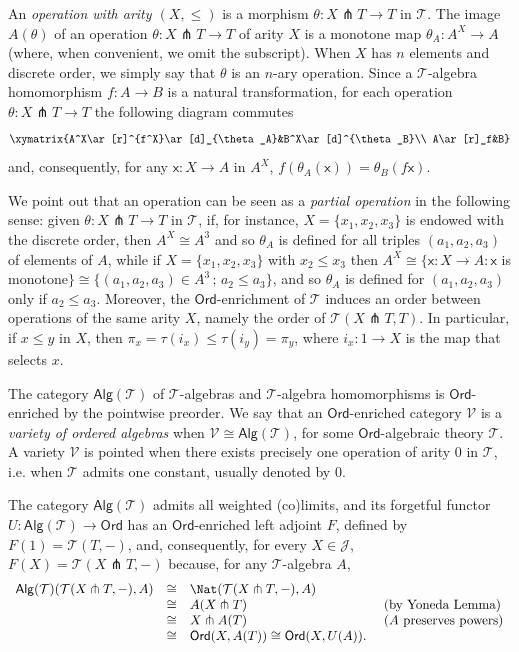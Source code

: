 \documentclass[11pt]{amsart}
\theoremstyle{plain}
\theoremstyle{definition}
\theoremstyle{remark}
\newcommand{\V}{\ensuremath{\mathcal{V}}}
\newcommand{\Ord}{\ensuremath{\mathsf{Ord}}}
\def\xx{\mathsf{x}}
\newcommand{\J}{\ensuremath{\mathcal{J}}}
\newcommand{\T}{\ensuremath{\mathcal{T}}}
\newcommand{\Alg}[1]{\ensuremath{\mathsf{Alg}(#1)}}
\begin{document}
  An \emph{operation with arity $(X,\le)$} is a morphism $\theta\colon X\pitchfork T  \to T$ in $\T$. The image $A(\theta)$ of an operation $\theta\colon X\pitchfork T\to T$ of arity $X$ is a monotone map $\theta_A\colon A^X\to A$ (where, when convenient, we omit the subscript). When $X$ has $n$ elements and discrete order, we simply say that $\theta$ is an $n$-ary operation.
  Since a $\T$-algebra homomorphism $f\colon A\to B$ is a natural transformation, for each operation $\theta\colon X\pitchfork T\to T$ the following diagram commutes
  \[\xymatrix{A^X\ar[r]^{f^X}\ar[d]_{\theta_A}&B^X\ar[d]^{\theta_B}\\
  A\ar[r]_f&B}\]
  and, consequently, for any $\xx\colon X\to A$ in $A^X$, $f(\theta_A(\xx))=\theta_B(f\xx).$

  We point out that an operation can be seen as a \emph{partial operation} in the following sense: given $\theta\colon X\pitchfork T\to T$ in $\T$, if, for instance, $X=\{x_1,x_2,x_3\}$ is endowed with the discrete order, then $A^X\cong A^3$ and so $\theta_A$ is defined for all triples $(a_1,a_2,a_3)$ of elements of $A$, while if $X=\{x_1,x_2,x_3\}$ with $x_2\leq x_3$ then $A^X\cong\{\xx\colon X\to A: \xx$ is monotone$\}\cong\{(a_1,a_2,a_3)\in A^3\,;\,a_2\leq a_3\}$, and so $\theta_A$ is defined for $(a_1,a_2,a_3)$ only if $a_2\leq a_3$. Moreover, the $\Ord$-enrichment of $\T$ induces an order between operations of the same arity $X$, namely the order of $\T(X\pitchfork T,T)$. In particular, if $x\leq y$ in $X$, then $\pi_x=\tau(i_x)\leq\tau(i_y)=\pi_y$, where $i_x\colon 1\to X$ is the map that selects $x$.


The category $\Alg{\T}$ of $\T$-algebras and $\T$-algebra homomorphisms is $\Ord$-enriched by the pointwise preorder. We say that an $\Ord$-enriched category $\V$ is a \emph{variety of ordered algebras} when $\V\cong \Alg{\T}$, for some $\Ord$-algebraic theory $\T$. A variety $\V$ is pointed when there exists precisely one operation of arity 0 in $\T$, i.e. when $\T$ admits one constant, usually denoted by 0.

The category $\Alg{\T}$ admits all weighted (co)limits, and its forgetful functor $U\colon\Alg\T\to\Ord$ has an $\Ord$-enriched left adjoint $F$, defined by
$F(1)=\T(T,-)$,
and, consequently, for every $X\in\J$, $F(X)=\T(X\pitchfork T,-)$ because, for any $\T$-algebra $A$,
\[\begin{array}{rcll}
\Alg{\T}(\T(X\pitchfork T,-),A)&\cong&\Nat(\T(X\pitchfork T,-),A)\\
&\cong&A(X\pitchfork T)&\mbox{ (by Yoneda Lemma)}\\
&\cong&X\pitchfork A(T)&\mbox{ ($A$ preserves powers)}\\
&\cong&\Ord(X,A(T))\cong \Ord(X,U(A)).\end{array}\]
\end{document}
